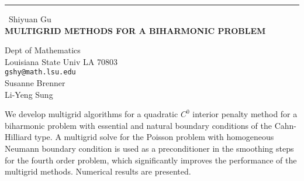 \documentclass{report}
\begin{document}
\begin{center}
\rule{6in}{1pt} \
{\large Shiyuan Gu \\
{\bf MULTIGRID METHODS FOR A BIHARMONIC PROBLEM}}

Dept of Mathematics \\ Louisiana State Univ LA 70803
\\
{\tt gshy@math.lsu.edu}\\
Susanne Brenner\\
Li-Yeng Sung\end{center}

We develop multigrid algorithms for a quadratic $C^0$ interior penalty
method for a biharmonic problem with essential and natural boundary
conditions of the Cahn-Hilliard type. A multigrid solve for the Poisson
problem with homogeneous Neumann boundary condition is used as a
preconditioner in the smoothing steps for the fourth order problem, which
significantly improves the performance of the multigrid methods.
Numerical results are presented.
\end{document}
